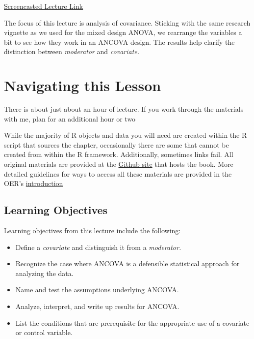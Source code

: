 \documentclass[
  11pt,
]{book}
\providecommand{\tightlist}{%
  \setlength{\itemsep}{0pt}\setlength{\parskip}{0pt}}
\begin{document}
\href{https://spu.hosted.panopto.com/Panopto/Pages/Viewer.aspx?pid=c0a9e50e-2e9d-4769-bd44-ad8c010143df}{Screencasted Lecture Link}

The focus of this lecture is analysis of covariance. Sticking with the same research vignette as we used for the mixed design ANOVA, we rearrange the variables a bit to see how they work in an ANCOVA design. The results help clarify the distinction between \emph{moderator} and \emph{covariate.}

\hypertarget{navigating-this-lesson-9}{%
\section{Navigating this Lesson}\label{navigating-this-lesson-9}}

There is about just about an hour of lecture. If you work through the materials with me, plan for an additional hour or two

While the majority of R objects and data you will need are created within the R script that sources the chapter, occasionally there are some that cannot be created from within the R framework. Additionally, sometimes links fail. All original materials are provided at the \href{https://github.com/lhbikos/ReCenterPsychStats}{Github site} that hosts the book. More detailed guidelines for ways to access all these materials are provided in the OER's \protect\hyperlink{ReCintro}{introduction}

\hypertarget{learning-objectives-9}{%
\subsection{Learning Objectives}\label{learning-objectives-9}}

Learning objectives from this lecture include the following:

\begin{itemize}
\tightlist
\item
  Define a \emph{covariate} and distinguish it from a \emph{moderator.}
\item
  Recognize the case where ANCOVA is a defensible statistical approach for analyzing the data.
\item
  Name and test the assumptions underlying ANCOVA.
\item
  Analyze, interpret, and write up results for ANCOVA.
\item
  List the conditions that are prerequisite for the appropriate use of a covariate or control variable.
\end{itemize}
\end{document}
